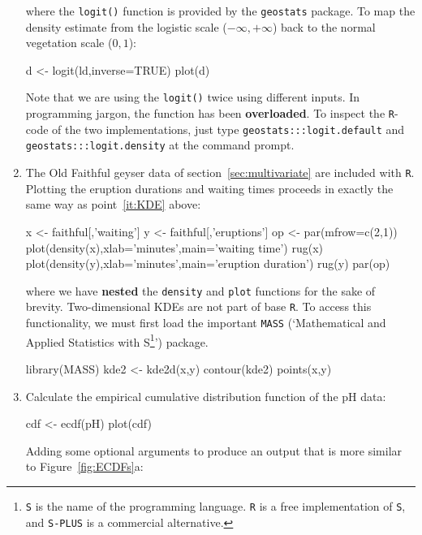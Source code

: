 \begin{enumerate}
\noindent where the \texttt{logit()} function is provided by the
\texttt{geostats} package. To map the density estimate from the
logistic scale ($-\infty,+\infty$) back to the normal vegetation scale
($0,1$):

\begin{script}[firstnumber=3]
d <- logit(ld,inverse=TRUE)
plot(d)
\end{script}

Note that we are using the \texttt{logit()} twice using different
inputs. In programming jargon, the function has been
\textbf{overloaded}. To inspect the \texttt{R}-code of the two
implementations, just type \texttt{geostats:::logit.default} and
\texttt{geostats:::logit.density} at the command prompt.

\item The Old Faithful geyser data of section~\ref{sec:multivariate}
  are included with \texttt{R}. Plotting the eruption durations and
  waiting times proceeds in exactly the same way as point~\ref{it:KDE}
  above:

\begin{script}
x <- faithful[,'waiting']
y <- faithful[,'eruptions']
op <- par(mfrow=c(2,1))
plot(density(x),xlab='minutes',main='waiting time')
rug(x)
plot(density(y),xlab='minutes',main='eruption duration')
rug(y)
par(op)
\end{script}

\noindent where we have \textbf{nested} the \texttt{density} and
\texttt{plot} functions for the sake of brevity. Two-dimensional KDEs
are not part of base \texttt{R}. To access this functionality, we must
first load the important \texttt{MASS} (`Mathematical and Applied
Statistics with S\footnote{\texttt{S} is the name of the programming
  language. \texttt{R} is a free implementation of \texttt{S}, and
  \texttt{S-PLUS} is a commercial alternative.}') package.

\begin{script}[firstnumber=3]
library(MASS)
kde2 <- kde2d(x,y)
contour(kde2)
points(x,y)
\end{script}

\item Calculate the empirical cumulative distribution function of the
  pH data:

\begin{script}
cdf <- ecdf(pH)
plot(cdf)
\end{script}

Adding some optional arguments to produce an output that is more
similar to Figure~\ref{fig:ECDFs}a:


\end{enumerate}
